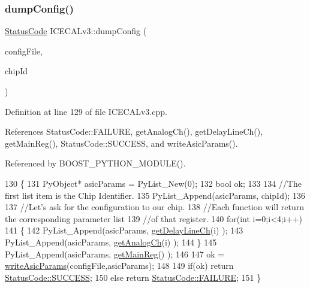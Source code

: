 \subsubsection{\texorpdfstring{dump\+Config()}{dumpConfig()}}
{\footnotesize\ttfamily \hyperlink{classStatusCode}{Status\+Code} I\+C\+E\+C\+A\+Lv3\+::dump\+Config (\begin{DoxyParamCaption}\item[{string}]{config\+File,  }\item[{Py\+Object $\ast$}]{chip\+Id }\end{DoxyParamCaption})}



Definition at line 129 of file I\+C\+E\+C\+A\+Lv3.\+cpp.



References Status\+Code\+::\+F\+A\+I\+L\+U\+RE, get\+Analog\+Ch(), get\+Delay\+Line\+Ch(), get\+Main\+Reg(), Status\+Code\+::\+S\+U\+C\+C\+E\+SS, and write\+Asic\+Params().



Referenced by B\+O\+O\+S\+T\+\_\+\+P\+Y\+T\+H\+O\+N\+\_\+\+M\+O\+D\+U\+L\+E().


\begin{DoxyCode}
130 \{
131     PyObject* asicParams = PyList\_New(0);
132     \textcolor{keywordtype}{bool} ok;
133 
134     \textcolor{comment}{//The first list item is the Chip Identifier.}
135     PyList\_Append(asicParams, chipId);
136 
137     \textcolor{comment}{//Let's ask for the configuration to our chip.}
138     \textcolor{comment}{//Each function will return the corresponding parameter list}
139     \textcolor{comment}{//of that register.}
140     \textcolor{keywordflow}{for}(\textcolor{keywordtype}{int} i=0;i<4;i++)
141     \{
142         PyList\_Append(asicParams, \hyperlink{classICECALv3_a7a1c1706a455903f42bb9a5257d94a78}{getDelayLineCh}(i) );
143         PyList\_Append(asicParams, \hyperlink{classICECALv3_a5f1414e6049a82eafdd505a88d7d0c91}{getAnalogCh}(i) );
144     \}
145     PyList\_Append(asicParams, \hyperlink{classICECALv3_a4a414d23c1e199b446dc876161338148}{getMainReg}() );
146 
147     ok = \hyperlink{classICECALv3_a9d7c33e6d113e7f721dc848d28ab44d8}{writeAsicParams}(configFile,asicParams);
148 
149     \textcolor{keywordflow}{if}(ok) \textcolor{keywordflow}{return} \hyperlink{classStatusCode_a6f565cbeadc76d14c72f047e5e85eb4badd0da38d3ba0d922efd1f4619bc37ad8}{StatusCode::SUCCESS};
150     \textcolor{keywordflow}{else}   \textcolor{keywordflow}{return} \hyperlink{classStatusCode_a6f565cbeadc76d14c72f047e5e85eb4ba3da73d4c469762eb9d3c960368252b26}{StatusCode::FAILURE};
151 \}
\end{DoxyCode}
\mbox{\label{classObject_a204a95f57818c0f811933917a30eff45}} 
